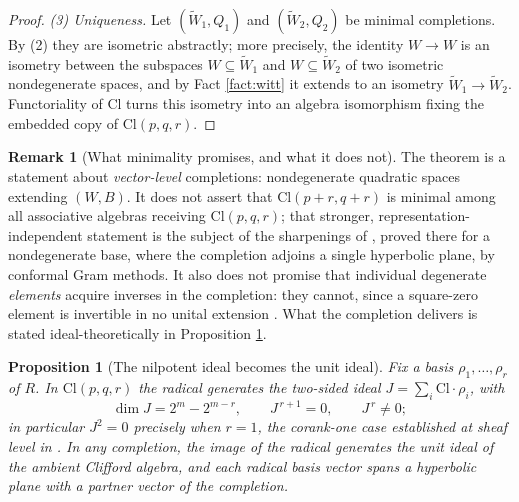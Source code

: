 \documentclass[11pt]{article}
\newtheorem{proposition}[theorem]{Proposition}
\theoremstyle{definition}
\newtheorem{remark}[theorem]{Remark}
\newcommand{\Cl}{\mathrm{Cl}}
\begin{document}
\begin{proof}
\emph{(3) Uniqueness.} Let $(\widetilde W_1, Q_1)$ and $(\widetilde W_2, Q_2)$ be minimal completions. By (2) they are isometric abstractly; more precisely, the identity $W \to W$ is an isometry between the subspaces $W \subseteq \widetilde W_1$ and $W \subseteq \widetilde W_2$ of two isometric nondegenerate spaces, and by Fact \ref{fact:witt} it extends to an isometry $\widetilde W_1 \to \widetilde W_2$. Functoriality of $\Cl$ turns this isometry into an algebra isomorphism fixing the embedded copy of $\Cl(p,q,r)$.
\end{proof}

\begin{remark}[What minimality promises, and what it does not]\label{rem:scope}
The theorem is a statement about \emph{vector-level} completions: nondegenerate quadratic spaces extending $(W,B)$. It does not assert that $\Cl(p{+}r,q{+}r)$ is minimal among all associative algebras receiving $\Cl(p,q,r)$; that stronger, representation-independent statement is the subject of the sharpenings of \cite[\S4.6]{ButlerT1}, proved there for a nondegenerate base, where the completion adjoins a single hyperbolic plane, by conformal Gram methods. It also does not promise that individual degenerate \emph{elements} acquire inverses in the completion: they cannot, since a square-zero element is invertible in no unital extension \cite[Lem.~2.1]{ButlerT1}. What the completion delivers is stated ideal-theoretically in Proposition \ref{prop:unitideal}.
\end{remark}

\begin{proposition}[The nilpotent ideal becomes the unit ideal]\label{prop:unitideal}
Fix a basis $\rho_1, \dots, \rho_r$ of $R$. In $\Cl(p,q,r)$ the radical generates the two-sided ideal $J = \sum_i \Cl \cdot \rho_i$, with
\[
\dim J = 2^m - 2^{m-r}, \qquad J^{\,r+1} = 0, \qquad J^{\,r} \neq 0 ;
\]
in particular $J^2 = 0$ precisely when $r = 1$, the corank-one case established at sheaf level in \cite[Thm.~3.1]{ButlerT4}. In any completion, the image of the radical generates the \emph{unit} ideal of the ambient Clifford algebra, and each radical basis vector spans a hyperbolic plane with a partner vector of the completion.
\end{proposition}
\end{document}
